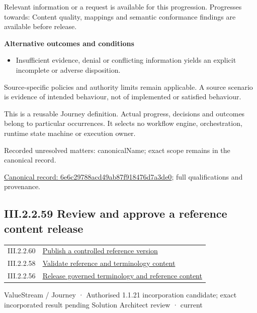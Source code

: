 Relevant information or a request is available for this progression. Progresses towards: Content quality, mappings and semantic conformance findings are available before release.



\par\medskip\textbf{Alternative outcomes and conditions}\par


\begin{itemize}


\item Insufficient evidence, denial or conflicting information yields an explicit incomplete or adverse disposition.

\end{itemize}


Source-specific policies and authority limits remain applicable. A source scenario is evidence of intended behaviour, not of implemented or satisfied behaviour.



This is a reusable Journey definition. Actual progress, decisions and outcomes belong to particular occurrences. It selects no workflow engine, orchestration, runtime state machine or execution owner.


{\small Recorded unresolved matters: canonicalName; exact scope remains in the canonical record.}\par
{\footnotesize \href{../../../../../../../continuum/strategy/value-stream/6e6c29788acd49ab87f918476d7a3de0.md}{Canonical record: 6e6c29788acd49ab87f918476d7a3de0}; full qualifications and provenance.}\par
\subsection*{III.2.2.59 Review and approve a reference content release}
\label{navigation:III.2.2.59}

\begin{longtable}{p{.22\linewidth}p{.73\linewidth}}
III.2.2.60 & \hyperref[element:156eb857d5c14baaae1c1cc59fe3490b]{Publish a controlled reference version} \\
III.2.2.58 & \hyperref[element:6e6c29788acd49ab87f918476d7a3de0]{Validate reference and terminology content} \\
III.2.2.56 & \hyperref[element:e9a8a77c5f9c4361af4dfcfa607ece2d]{Release governed terminology and reference content} \\
\end{longtable}
\label{element:cdca249dbbef4d798219d4732bd8e74f}
{\small ValueStream / Journey · Authorised 1.1.21 incorporation candidate; exact incorporated result pending Solution Architect review · current}\par


